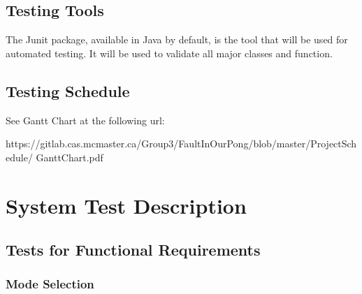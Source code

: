 \documentclass[12pt,letterpaper]{article}
\begin{document}
	\subsection{Testing Tools}
	The Junit package, available in Java by default, is the tool that will be used for automated testing. It will be used to validate all major classes and function.
	
	\subsection{Testing Schedule}
	See Gantt Chart at the following url:

\noindent https://gitlab.cas.mcmaster.ca/Group3/FaultInOurPong/blob/master/ProjectSchedule/
GanttChart.pdf\\

	\section{System Test Description}
	\subsection{Tests for Functional Requirements}
	\subsubsection{Mode Selection}
\end{document}
